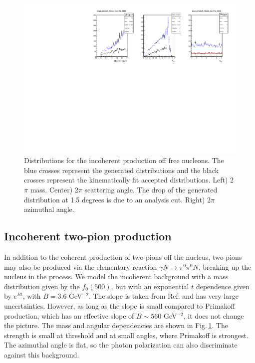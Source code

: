 \begin{figure}[tbp]
\begin{center}
\includegraphics[width=16cm,clip=true]{figures/twopi_primakoff_DSelect_test_File_20000_IC.pdf}
\caption{Distributions for the incoherent production off free nucleons. The blue crosses represent the generated distributions and the black crosses represent the kinematically fit accepted distributions.
Left) 2$\pi$ mass. Center) 2$\pi$ scattering angle. The drop of the generated distribution at 1.5 degrees is due to an analysis cut. Right) 2$\pi$ azimuthal angle.
\label{fig:IC}}
\end{center} 
\end{figure}

\subsection{Incoherent two-pion production}
In addition to the coherent production of two pions off the nucleus,
two pions may also be produced via the elementary reaction $\gamma
N\to \pi^0 \pi^0 N$, breaking up the nucleus in the process. We model
the incoherent background with a mass distribution given by the
$f_0(500)$, but with an exponential $t$ dependence given by $e^{Bt}$,
with $B=3.6$ GeV$^{-2}$. The slope is taken from
Ref.\cite{Battaglieri:2009aa} and has very large
uncertainties. However, as long as the slope is small compared to
Primakoff production, which has an effective slope of $B\sim560$
GeV$^{-2}$, it does not change the picture. The mass and angular
dependencies are shown in Fig.\,\ref{fig:IC}. The strength is small at
threshold and at small angles, where Primakoff is strongest. The
azimuthal angle is flat, so the photon polarization can also
discriminate against this background.

